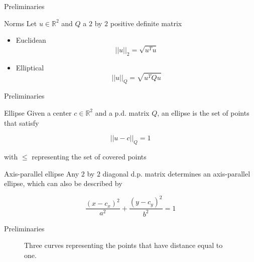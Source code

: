 \documentclass{beamer}
\newcommand{\R}{\mathbb{R}}
\begin{document}
\begin{frame}{Preliminaries}
	
	\begin{block}{Norms}
		Let $u \in \R^2$ and $Q$ a $2$ by $2$ positive definite matrix
		\begin{itemize}
			\item Euclidean
			\begin{equation*}
			||u||_2 = \sqrt{u^Tu}
			\end{equation*}
			
			\item Elliptical
			\begin{equation*}
			||u||_{Q} = \sqrt{u^TQu}
			\end{equation*}
		\end{itemize}
	\end{block}



\end{frame}

\begin{frame}{Preliminaries}
	
	\begin{block}{Ellipse}
		Given a center $c \in \R^2$ and a p.d. matrix $Q$, an ellipse is the set of points that satisfy
		
		\begin{equation*}
		||u-c||_Q = 1
		\end{equation*}
		
		with $\le$ representing the set of covered points
	\end{block}

	\begin{block}{Axis-parallel ellipse}
		Any $2$ by $2$ diagonal d.p. matrix determines an axis-parallel ellipse, which can also be described by
		
		\begin{equation*}
		\frac{(x-c_x)^2}{a^2} + \frac{(y-c_y)^2}{b^2} = 1
		\end{equation*}
	\end{block}

\end{frame}

\begin{frame}{Preliminaries}
	\begin{figure}[H]
		\centering
		
		\caption{Three curves representing the points that have distance equal to one.}
		
		\label{fig:3ellipses_intersect}
	\end{figure}
\end{frame}
\end{document}
